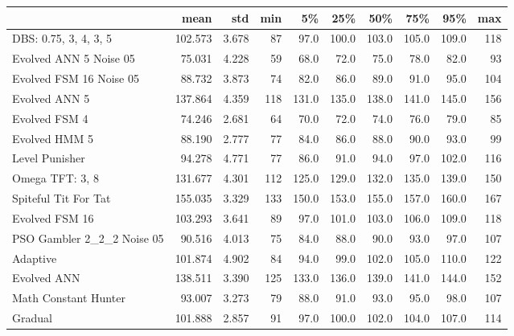 \begin{tabular}{lrrrrrrrrr}
\toprule
{} &     mean &    std &  min &     5\% &    25\% &    50\% &    75\% &    95\% &  max \\
\midrule
DBS: 0.75, 3, 4, 3, 5      &  102.573 &  3.678 &   87 &   97.0 &  100.0 &  103.0 &  105.0 &  109.0 &  118 \\
Evolved ANN 5 Noise 05     &   75.031 &  4.228 &   59 &   68.0 &   72.0 &   75.0 &   78.0 &   82.0 &   93 \\
Evolved FSM 16 Noise 05    &   88.732 &  3.873 &   74 &   82.0 &   86.0 &   89.0 &   91.0 &   95.0 &  104 \\
Evolved ANN 5              &  137.864 &  4.359 &  118 &  131.0 &  135.0 &  138.0 &  141.0 &  145.0 &  156 \\
Evolved FSM 4              &   74.246 &  2.681 &   64 &   70.0 &   72.0 &   74.0 &   76.0 &   79.0 &   85 \\
Evolved HMM 5              &   88.190 &  2.777 &   77 &   84.0 &   86.0 &   88.0 &   90.0 &   93.0 &   99 \\
Level Punisher             &   94.278 &  4.771 &   77 &   86.0 &   91.0 &   94.0 &   97.0 &  102.0 &  116 \\
Omega TFT: 3, 8            &  131.677 &  4.301 &  112 &  125.0 &  129.0 &  132.0 &  135.0 &  139.0 &  150 \\
Spiteful Tit For Tat       &  155.035 &  3.329 &  133 &  150.0 &  153.0 &  155.0 &  157.0 &  160.0 &  167 \\
Evolved FSM 16             &  103.293 &  3.641 &   89 &   97.0 &  101.0 &  103.0 &  106.0 &  109.0 &  118 \\
PSO Gambler 2\_2\_2 Noise 05 &   90.516 &  4.013 &   75 &   84.0 &   88.0 &   90.0 &   93.0 &   97.0 &  107 \\
Adaptive                   &  101.874 &  4.902 &   84 &   94.0 &   99.0 &  102.0 &  105.0 &  110.0 &  122 \\
Evolved ANN                &  138.511 &  3.390 &  125 &  133.0 &  136.0 &  139.0 &  141.0 &  144.0 &  152 \\
Math Constant Hunter       &   93.007 &  3.273 &   79 &   88.0 &   91.0 &   93.0 &   95.0 &   98.0 &  107 \\
Gradual                    &  101.888 &  2.857 &   91 &   97.0 &  100.0 &  102.0 &  104.0 &  107.0 &  114 \\
\bottomrule
\end{tabular}
